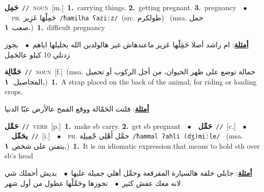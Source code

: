 \documentclass[10pt,a4paper,twoside]{article} %
\begin{document}
\begin{multicols}{2}
{\setlength\topsep{0pt}\textbf{\foreignlanguage{arabic}{حَمِل}}\ {\color{gray}\texttt{//}\color{black}}\ \textsc{noun}\ [m.]\ \textbf{1.}~carrying things.  \textbf{2.}~getting pregnant.  \textbf{3.}~pregnancy\ \ $\bullet$\ \ \textsc{ph.} \color{gray} \foreignlanguage{arabic}{حَمِلْهَا عَزِيز}\color{black}\ {\color{gray}\texttt{/{\sffamily ħamilha ʕaziːz}/}\color{black}}\ \color{gray}(src. \foreignlanguage{arabic}{طولكرم})\color{black}\ \color{gray} (msa. \foreignlanguage{arabic}{حمل صعب}~\foreignlanguage{arabic}{\textbf{١.}})\color{black}\ \textbf{1.}~difficult pregnancy\  \begin{flushright}\color{gray}\foreignlanguage{arabic}{\textbf{\underline{\foreignlanguage{arabic}{أمثلة}}}: ام راشد أصلا حَمَِلْها عَزيز ماعندهاش غير هالولدين الله يخليلها اياهم\ $\bullet$\ \  بجوز زدتلي 10 كيلو عالحَمِل}\end{flushright}\color{black}} \vspace{2mm}

{\setlength\topsep{0pt}\textbf{\foreignlanguage{arabic}{حَمَّالِة}}\ {\color{gray}\texttt{//}\color{black}}\ \textsc{noun}\ [f.]\ \color{gray}(msa. \foreignlanguage{arabic}{حمالة توضع على ظهر الحيوان، من أجل الركوب أو تحميل المحاصيل.}~\foreignlanguage{arabic}{\textbf{١.}})\color{black}\ \textbf{1.}~A strap placed on the back of the animal, for riding or loading crops.\  \begin{flushright}\color{gray}\foreignlanguage{arabic}{\textbf{\underline{\foreignlanguage{arabic}{أمثلة}}}: فلتت الحَمّالة ووقع القمح عالأرض عبّا الدنيا}\end{flushright}\color{black}} \vspace{2mm}

{\setlength\topsep{0pt}\textbf{\foreignlanguage{arabic}{حَمَّل}}\ {\color{gray}\texttt{//}\color{black}}\ \textsc{verb}\ [p.]\ \textbf{1.}~make sb carry.  \textbf{2.}~get sb pregnant\ \ $\bullet$\ \ \setlength\topsep{0pt}\textbf{\foreignlanguage{arabic}{حَمِّل}}\ {\color{gray}\texttt{//}\color{black}}\ [c.]\ \ $\bullet$\ \ \setlength\topsep{0pt}\textbf{\foreignlanguage{arabic}{يحَمِّل}}\ {\color{gray}\texttt{//}\color{black}}\ [i.]\ \ $\bullet$\ \ \textsc{ph.} \color{gray} \foreignlanguage{arabic}{حمَّل أَهْلِي جْمِيلِة}\color{black}\ {\color{gray}\texttt{/{\sffamily ħammal ʔahli (dʒ)miːle}/}\color{black}}\ \color{gray} (msa. \foreignlanguage{arabic}{يتمنن على شخص}~\foreignlanguage{arabic}{\textbf{١.}})\color{black}\ \textbf{1.}~It is an idiomatic expression that means to hold sth over sb's head\  \begin{flushright}\color{gray}\foreignlanguage{arabic}{\textbf{\underline{\foreignlanguage{arabic}{أمثلة}}}: جابلي خلقة هالسيارة المقرقعة وحمَّل أهلي جميلة عليها\ $\bullet$\ \  بديش أحملك شي لانه معك عفش كثير\ $\bullet$\ \  تجوزها وحَمَّلْها عطول من أول شهر}\end{flushright}\color{black}} \vspace{2mm}


\end{multicols}
\end{document}
